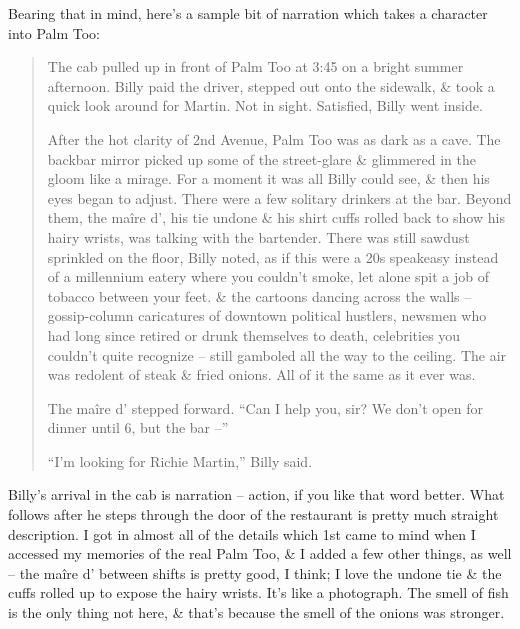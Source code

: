 \documentclass{article}
\numberwithin{equation}{section}
\begin{document}
Bearing that in mind, here's a sample bit of narration which takes a character into Palm Too:
\begin{quotation}
	The cab pulled up in front of Palm Too at 3:45 on a bright summer afternoon. Billy paid the driver, stepped out onto the sidewalk, \& took a quick look around for Martin. Not in sight. Satisfied, Billy went inside.
	
	After the hot clarity of 2nd Avenue, Palm Too was as dark as a cave. The backbar mirror picked up some of the street-glare \& glimmered in the gloom like a mirage. For a moment it was all Billy could see, \& then his eyes began to adjust. There were a few solitary drinkers at the bar. Beyond them, the ma\^ire d', his tie undone \& his shirt cuffs rolled back to show his hairy wrists, was talking with the bartender. There was still sawdust sprinkled on the floor, Billy noted, as if this were a 20s speakeasy instead of a millennium eatery where you couldn't smoke, let alone spit a job of tobacco between your feet. \& the cartoons dancing across the walls -- gossip-column caricatures of downtown political hustlers, newsmen who had long since retired or drunk themselves to death, celebrities you couldn't quite recognize -- still gamboled all the way to the ceiling. The air was redolent of steak \& fried onions. All of it the same as it ever was.
	
	The ma\^ire d' stepped forward. ``Can I help you, sir? We don't open for dinner until 6, but the bar --''
	
	``I'm looking for Richie Martin,'' Billy said.
\end{quotation}
Billy's arrival in the cab is narration -- action, if you like that word better. What follows after he steps through the door of the restaurant is pretty much straight description. I got in almost all of the details which 1st came to mind when I accessed my memories of the real Palm Too, \& I added a few other things, as well -- the ma\^ire d' between shifts is pretty good, I think; I love the undone tie \& the cuffs rolled up to expose the hairy wrists. It's like a photograph. The smell of fish is the only thing not here, \& that's because the smell of the onions was stronger.
\end{document}
